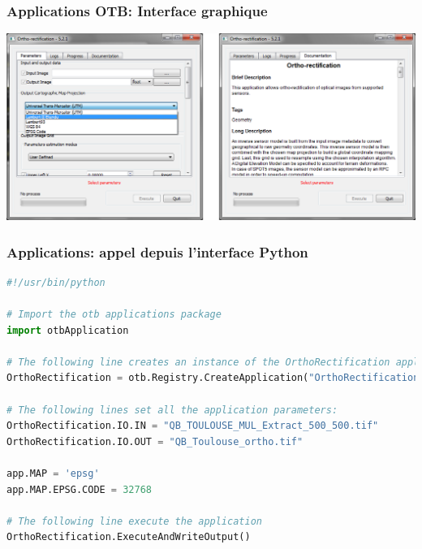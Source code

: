 \documentclass[8pt]{beamer}
\begin{document}
\begin{frame}[fragile]
\frametitle{Applications OTB: Interface graphique}
\begin{center}
\includegraphics[width=1\textwidth]{images/otbgui.png}
\end{center}
\end{frame}

\begin{frame}[fragile]
\frametitle{Applications: appel depuis l'interface Python}
\begin{lstlisting}[language=python,breaklines=true,breakatwhitespace=true,frame = tb,framerule = 0.25pt,fontadjust,backgroundcolor={\color{listlightgray}},basicstyle = {\ttfamily\tiny},keywordstyle = {\ttfamily\color{listkeyword}\textbf},identifierstyle = {\ttfamily},commentstyle = {\ttfamily\color{listcomment}\textit},stringstyle = {\ttfamily},showstringspaces = false,showtabs = false,numbers = none,numbersep = 6pt, numberstyle={\ttfamily\color{listnumbers}},tabsize = 2]
#!/usr/bin/python

# Import the otb applications package
import otbApplication

# The following line creates an instance of the OrthoRectification application
OrthoRectification = otb.Registry.CreateApplication("OrthoRectification")

# The following lines set all the application parameters:
OrthoRectification.IO.IN = "QB_TOULOUSE_MUL_Extract_500_500.tif"
OrthoRectification.IO.OUT = "QB_Toulouse_ortho.tif"

app.MAP = 'epsg'
app.MAP.EPSG.CODE = 32768

# The following line execute the application
OrthoRectification.ExecuteAndWriteOutput()
\end{lstlisting}
\end{frame}
\end{document}
